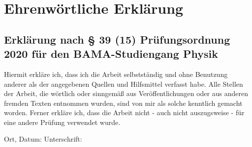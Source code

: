\chapter*{Ehrenwörtliche Erklärung}

\vspace{2cm}

\section*{Erklärung nach § 39 (15) Prüfungsordnung 2020 für den BAMA-Studiengang Physik}

\vspace{1cm}

Hiermit erkläre ich, dass ich die Arbeit selbstständig und ohne Benutzung anderer als der angegebenen Quellen und Hilfsmittel verfasst habe. Alle Stellen der Arbeit, die wörtlich oder sinngemäß aus Veröffentlichungen oder aus anderen fremden Texten entnommen wurden, sind von mir als solche kenntlich gemacht worden. Ferner erkläre ich, dass die Arbeit nicht - auch nicht auszugsweise - für eine andere Prüfung verwendet wurde.

\vspace{4cm}

\noindent
Ort, Datum: \dotfill \hspace{1cm} Unterschrift: \dotfill

\vspace{3cm}
